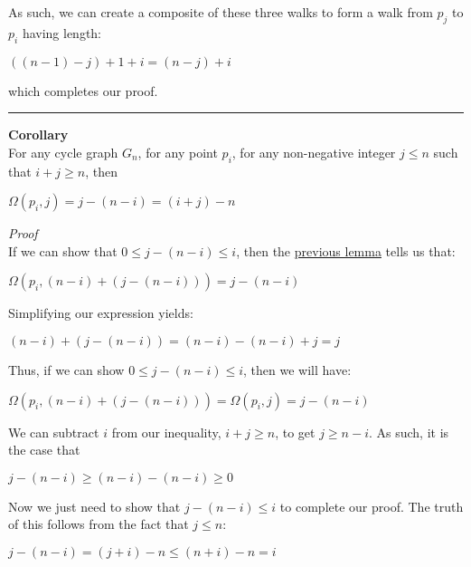 \documentclass[a4paper,12pt]{article}
\begin{document}
\noindent As such, we can create a composite of these three walks to form a walk from $p_j$ to $p_i$ having length:

\begin{center}
$((n - 1) - j) + 1 + i = (n - j) + i$
\end{center}

\noindent which completes our proof.

\begin{center}
\noindent\rule{8cm}{0.4pt}
\end{center}




\label{corollary:Omega_result_2}
\hypertarget{corollary:Omega_result_2}{}
\begin{tcolorbox}
\textbf{Corollary}\\
For any cycle graph $G_n$, for any point $p_i$, for any non-negative integer $j \leq n$ such that $i + j \geq n$, then

\begin{center}
$\Omega(p_i, j) = j - (n - i) = (i + j) - n$
\end{center}
\end{tcolorbox}

\noindent
\textit{Proof}\\
If we can show that $0 \leq j - (n - i) \leq i$, then the \hyperlink{lemma:existence_of_walk_2}{previous lemma} tells us that:
\begin{center}
$\Omega(p_i, (n - i) + (j - (n - i))) = j - (n - i)$
\end{center}

\noindent Simplifying our expression yields:
\begin{center}
$(n - i) + (j - (n - i)) = (n - i) - (n - i) + j = j$
\end{center}

\noindent Thus, if we can show $0 \leq j - (n - i) \leq i$, then we will have:
\begin{center}
$\Omega(p_i, (n - i) + (j - (n - i))) = \Omega(p_i, j) = j - (n - i)$
\end{center}

\noindent We can subtract $i$ from our inequality, $i + j \geq n$, to get $j \geq n - i$. As such, it is the case that
\begin{center}
$j - (n - i) \geq (n - i) - (n - i) \geq 0$
\end{center}

\noindent Now we just need to show that $j - (n - i) \leq i$ to complete our proof. The truth of this follows from the fact that $j \leq n$:
\begin{center}
$j - (n - i) = (j + i) - n \leq (n + i) - n = i$
\end{center}
\end{document}
